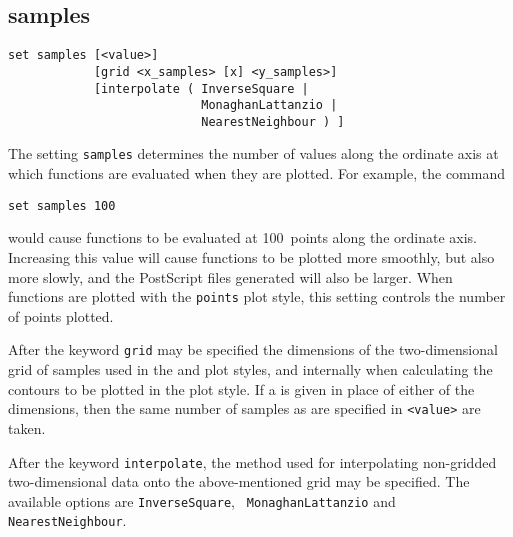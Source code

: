 %
%


\subsection{samples}

\begin{verbatim}
set samples [<value>]
            [grid <x_samples> [x] <y_samples>]
            [interpolate ( InverseSquare |
                           MonaghanLattanzio |
                           NearestNeighbour ) ]
\end{verbatim}

The setting {\tt samples} determines the number of values along the ordinate
axis at which functions are evaluated when they are plotted. For example, the
command

\begin{verbatim}
set samples 100
\end{verbatim}

\noindent would cause functions to be evaluated at 100~points along the
ordinate axis.  Increasing this value will cause functions to be plotted more
smoothly, but also more slowly, and the PostScript files generated will also be
larger. When functions are plotted with the {\tt points} plot style, this
setting controls the number of points plotted.

After the keyword {\tt grid} may be specified the dimensions of the
two-dimensional grid of samples used in the  and
 plot styles, and internally when calculating the contours to
be plotted in the  plot style. If a {\tt *} is given in
place of either of the dimensions, then the same number of samples as are
specified in {\tt <value>} are taken.

After the keyword {\tt interpolate}, the method used for interpolating
non-gridded two-dimensional data onto the above-mentioned grid may be
specified. The available options are {\tt Inverse\-Square}, {\tt
Monag\-han\-Lat\-tan\-zio} and {\tt Nearest\-Neigh\-bour}.


